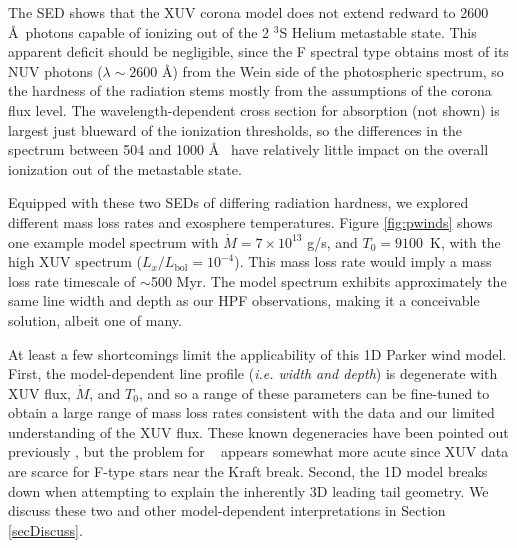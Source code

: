 \documentclass[twocolumn]{aastex631}
\newcommand{\hatpb}{\object{HAT-P-67 b}}
\begin{document}
The SED shows that the XUV corona model does not extend redward to 2600 \AA~photons capable of ionizing out of the 2 $^3$S Helium metastable state.  This apparent deficit should be negligible, since the F spectral type obtains most of its NUV photons ($\lambda\sim2600$ \AA) from the Wein side of the photospheric spectrum, so the hardness of the radiation stems mostly from the assumptions of the corona flux level.  The wavelength-dependent cross section for absorption (not shown) is largest just blueward of the ionization thresholds, so the differences in the spectrum between 504 and 1000 \AA~ have relatively little impact on the overall ionization out of the metastable state.

Equipped with these two SEDs of differing radiation hardness, we explored different mass loss rates and exosphere temperatures.  Figure \ref{fig:pwinds} shows one example model spectrum with $\dot{M} = 7\times10^{13}$ g/s, and $T_0=9100$~K, with the high XUV spectrum ($L_x/L_\mathrm{bol}=10^{-4}$).  This mass loss rate would imply a mass loss rate timescale of $\sim$500 Myr.  The model spectrum exhibits approximately the same line width and depth as our HPF observations, making it a conceivable solution, albeit one of many.

At least a few shortcomings limit the applicability of this 1D Parker wind model.  First, the model-dependent line profile (\emph{i.e. width and depth}) is degenerate with XUV flux, $\dot{M}$, and $T_0$, and so a range of these parameters can be fine-tuned to obtain a large range of mass loss rates consistent with the data and our limited understanding of the XUV flux.  These known degeneracies have been pointed out previously \citep{2022AJ....164..234V,2019ApJ...881..133O}, but the problem for \hatpb~ appears somewhat more acute since XUV data are scarce for F-type stars near the Kraft break.  Second, the 1D model breaks down when attempting to explain the inherently 3D leading tail geometry.  We discuss these two and other model-dependent interpretations in Section \ref{secDiscuss}.
\end{document}
